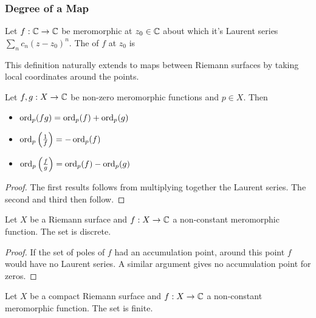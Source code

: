 \documentclass{article}
\begin{document}
\subsubsection{Degree of a Map}

\begin{definition}
	Let $f:\mathbb{C} \to \mathbb{C}$ be meromorphic at $z_0 \in \mathbb{C}$ about which it's Laurent series $\sum_n c_n (z-z_0)^n$. The  of $f$ at $z_0$ is 
\end{definition}

\begin{remark}
	This definition naturally extends to maps between Riemann surfaces by taking local coordinates around the points. 
\end{remark}

\begin{lemma}
	Let $f,g : X \to \mathbb{C}$ be non-zero meromorphic functions and $p  \in X$. Then 
	\begin{itemize}
		\item $\operatorname{ord}_p(fg) = \operatorname{ord}_p(f) + \operatorname{ord}_p(g)$
		\item $\operatorname{ord}_p\left( \frac{1}{f} \right) = -\operatorname{ord}_p(f)$
		\item $\operatorname{ord}_p\left( \frac{f}{g} \right) = \operatorname{ord}_p(f) - \operatorname{ord}_p(g)$
	\end{itemize}
\end{lemma}
\begin{proof}
	The first results follows from multiplying together the Laurent series. The second and third then follow. 
\end{proof}

\begin{lemma}
	Let $X$ be a Riemann surface and $f:X \to \mathbb{C}$ a non-constant meromorphic function. The set
is discrete.
\end{lemma}
\begin{proof}
	If the set of poles of $f$ had an accumulation point, around this point $f$ would have no Laurent series. A similar argument gives no accumulation point for zeros. 
\end{proof}

\begin{corollary}
Let $X$ be a  compact Riemann surface and $f:X \to \mathbb{C}$ a non-constant meromorphic function. The set
is finite.
\end{corollary}
\end{document}
